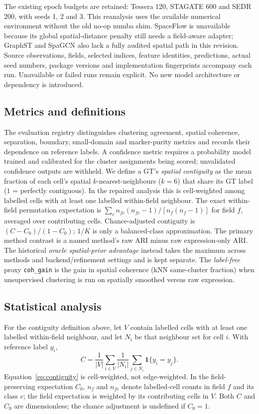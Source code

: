 \documentclass[11pt]{article}
\begin{document}
The existing epoch budgets are retained: Tessera 120, STAGATE 600 and SEDR 200, with seeds 1, 2 and 3. This reanalysis uses the available numerical environment without the old no-op numba shim. SpaceFlow is unavailable because its global spatial-distance penalty still needs a field-aware adapter; GraphST and SpaGCN also lack a fully audited spatial path in this revision. Source observations, fields, selected indices, feature identities, predictions, actual seed numbers, package versions and implementation fingerprints accompany each run. Unavailable or failed runs remain explicit. No new model architecture or dependency is introduced.

\subsection{Metrics and definitions}
The evaluation registry distinguishes clustering agreement, spatial coherence, separation, boundary, small-domain and marker-purity metrics and records their dependence on reference labels. A confidence metric requires a probability model trained and calibrated for the cluster assignments being scored; unvalidated confidence outputs are withheld. We define a GT's \emph{spatial contiguity} as the mean fraction of each
cell's spatial $k$-nearest-neighbours ($k{=}6$) that share its GT label ($1$ = perfectly contiguous). In the repaired analysis this is cell-weighted among labelled cells with at least one labelled within-field neighbour. The exact within-field permutation expectation is $\sum_c n_{fc}(n_{fc}-1)/[n_f(n_f-1)]$ for field $f$, averaged over contributing cells. Chance-adjusted contiguity is $(C-C_0)/(1-C_0)$; $1/K$ is only a balanced-class approximation. The primary method contrast is a named method's raw ARI minus raw expression-only ARI. The historical \emph{oracle spatial-prior advantage} instead takes the maximum across methods and backend/refinement settings and is kept separate. The \emph{label-free} proxy \texttt{coh\_gain} is the gain
in spatial coherence (kNN same-cluster fraction) when unsupervised clustering is run on spatially smoothed
versus raw expression.

\subsection{Statistical analysis}
For the contiguity definition above, let $V$ contain labelled cells with at
least one labelled within-field neighbour, and let $N_i$ be that neighbour
set for cell $i$. With reference label $y_i$,
\begin{equation}\label{eq:contiguity}
C=\frac{1}{|V|}\sum_{i\in V}\frac{1}{|N_i|}
\sum_{j\in N_i}\mathbf{1}\{y_i=y_j\}.
\end{equation}
Equation~\ref{eq:contiguity} is cell-weighted, not edge-weighted. In the
field-preserving expectation $C_0$, $n_f$ and $n_{fc}$ denote labelled-cell
counts in field $f$ and its class $c$; the field expectation is weighted
by its contributing cells in $V$. Both $C$ and $C_0$ are dimensionless;
the chance adjustment is undefined if $C_0=1$.
\end{document}
